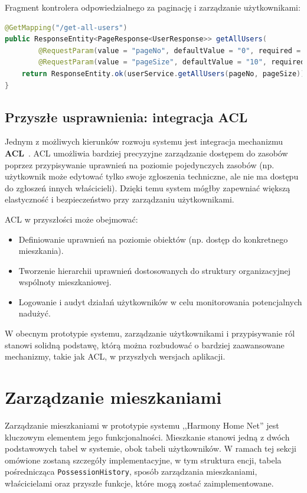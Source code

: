 Fragment kontrolera odpowiedzialnego za paginację i zarządzanie użytkownikami:
\begin{lstlisting}[language=Java, caption=Metoda paginacji w \texttt{UserController}]
@GetMapping("/get-all-users")
public ResponseEntity<PageResponse<UserResponse>> getAllUsers(
        @RequestParam(value = "pageNo", defaultValue = "0", required = false) int pageNo,
        @RequestParam(value = "pageSize", defaultValue = "10", required = false) int pageSize) {
    return ResponseEntity.ok(userService.getAllUsers(pageNo, pageSize));
}
\end{lstlisting}

\subsection{Przyszłe usprawnienia: integracja ACL}

Jednym z możliwych kierunków rozwoju systemu jest integracja mechanizmu \textbf{ACL}~\cite{acl}. ACL umożliwia bardziej precyzyjne zarządzanie dostępem do zasobów poprzez przypisywanie uprawnień na poziomie pojedynczych zasobów (np. użytkownik może edytować tylko swoje zgłoszenia techniczne, ale nie ma dostępu do zgłoszeń innych właścicieli). Dzięki temu system mógłby zapewniać większą elastyczność i bezpieczeństwo przy zarządzaniu użytkownikami.

ACL w przyszłości może obejmować:
\begin{itemize}
    \item Definiowanie uprawnień na poziomie obiektów (np. dostęp do konkretnego mieszkania).
    \item Tworzenie hierarchii uprawnień dostosowanych do struktury organizacyjnej wspólnoty mieszkaniowej.
    \item Logowanie i audyt działań użytkowników w celu monitorowania potencjalnych nadużyć.
\end{itemize}

W obecnym prototypie systemu, zarządzanie użytkownikami i przypisywanie ról stanowi solidną podstawę, którą można rozbudować o bardziej zaawansowane mechanizmy, takie jak ACL, w przyszłych wersjach aplikacji.


\section{Zarządzanie mieszkaniami}

Zarządzanie mieszkaniami w prototypie systemu ,,Harmony Home Net'' jest kluczowym elementem jego funkcjonalności. Mieszkanie stanowi jedną z dwóch podstawowych tabel w systemie, obok tabeli użytkowników. W ramach tej sekcji omówione zostaną szczegóły implementacyjne, w tym struktura encji, tabela pośrednicząca \texttt{PossessionHistory}, sposób zarządzania mieszkaniami, właścicielami oraz przyszłe funkcje, które mogą zostać zaimplementowane.

